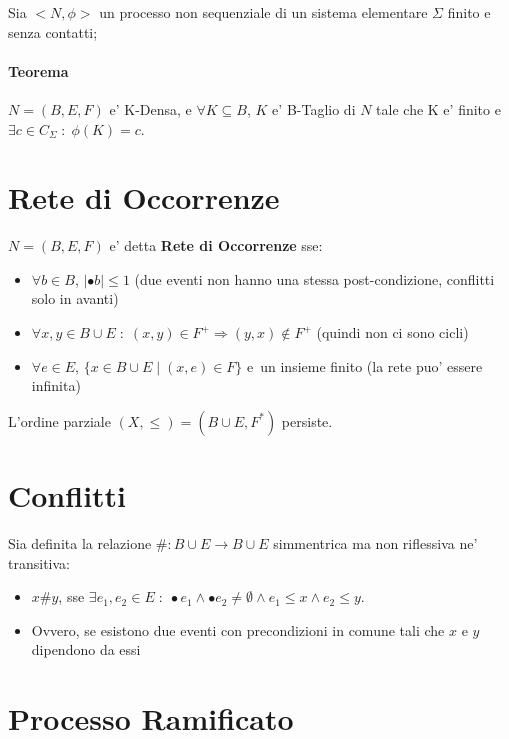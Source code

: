Sia $<N , \phi>$ un processo non sequenziale di un sistema elementare $\Sigma$ finito e senza contatti;

\paragraph{Teorema}

$N = (B, E, F)$ e' K-Densa, e $\forall K \subseteq B$, $K$ e' B-Taglio di $N$ tale che K e' finito e $\exists c \in C_\Sigma \; : \; \phi(K) = c$.

\section{Rete di Occorrenze}

$N = (B, E, F)$ e' detta \textbf{Rete di Occorrenze} sse:

\begin{itemize}
    \item $\forall b \in B$, $|\bullet b| \leq 1$ (due eventi non hanno una stessa post-condizione, conflitti solo in avanti)
    \item $\forall x,y \in B \cup E \; : \; (x, y) \in F^+ \Rightarrow (y, x) \notin F^+$ (quindi non ci sono cicli)
    \item $\forall e \in E$, $\{ x \in B \cup E \; | \; (x, e) \in F \}$ e\ un insieme finito (la rete puo' essere infinita)
\end{itemize}

L'ordine parziale $(X, \leq) = (B \cup E, F^*)$ persiste.

\section{Conflitti}

Sia definita la relazione $\# : B \cup E \rightarrow B \cup E$ simmentrica ma non riflessiva ne' transitiva:

\begin{itemize}
    \item $x \# y$, sse $\exists e_1,e_2 \in E \; : \; \bullet e_1 \land \bullet e_2 \neq \emptyset \land e_1 \leq x \land e_2 \leq y$.
    \item Ovvero, se esistono due eventi con precondizioni in comune tali che $x$ e $y$ dipendono da essi
\end{itemize}

\section{Processo Ramificato}

